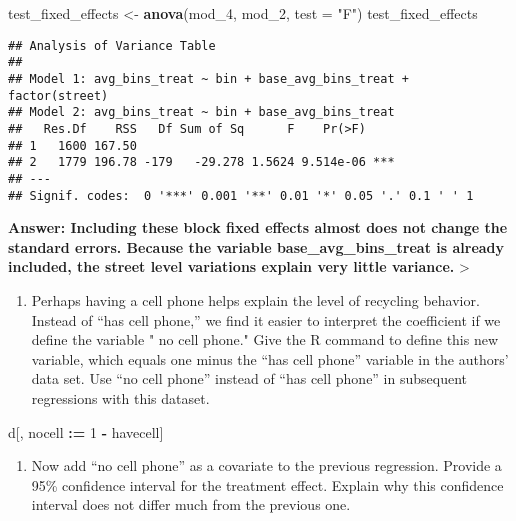 \documentclass[
]{article}
\newenvironment{Shaded}{\begin{snugshade}}{\end{snugshade}}
\newcommand{\DataTypeTok}[1]{\textcolor[rgb]{0.13,0.29,0.53}{#1}}
\newcommand{\DecValTok}[1]{\textcolor[rgb]{0.00,0.00,0.81}{#1}}
\newcommand{\ErrorTok}[1]{\textcolor[rgb]{0.64,0.00,0.00}{\textbf{#1}}}
\newcommand{\KeywordTok}[1]{\textcolor[rgb]{0.13,0.29,0.53}{\textbf{#1}}}
\newcommand{\NormalTok}[1]{#1}
\newcommand{\OperatorTok}[1]{\textcolor[rgb]{0.81,0.36,0.00}{\textbf{#1}}}
\newcommand{\StringTok}[1]{\textcolor[rgb]{0.31,0.60,0.02}{#1}}
\providecommand{\tightlist}{%
  \setlength{\itemsep}{0pt}\setlength{\parskip}{0pt}}
\begin{document}
\begin{Shaded}
\begin{Highlighting}[]
\NormalTok{test_fixed_effects <-}\StringTok{ }\KeywordTok{anova}\NormalTok{(mod_}\DecValTok{4}\NormalTok{, mod_}\DecValTok{2}\NormalTok{, }\DataTypeTok{test =} \StringTok{"F"}\NormalTok{)}
\NormalTok{test_fixed_effects}
\end{Highlighting}
\end{Shaded}

\begin{verbatim}
## Analysis of Variance Table
## 
## Model 1: avg_bins_treat ~ bin + base_avg_bins_treat + factor(street)
## Model 2: avg_bins_treat ~ bin + base_avg_bins_treat
##   Res.Df    RSS   Df Sum of Sq      F    Pr(>F)    
## 1   1600 167.50                                    
## 2   1779 196.78 -179   -29.278 1.5624 9.514e-06 ***
## ---
## Signif. codes:  0 '***' 0.001 '**' 0.01 '*' 0.05 '.' 0.1 ' ' 1
\end{verbatim}

\textbf{Answer: Including these block fixed effects almost does not
change the standard errors. Because the variable base\_avg\_bins\_treat
is already included, the street level variations explain very little
variance.} \textgreater{}

\begin{enumerate}
\def\labelenumi{\arabic{enumi}.}
\setcounter{enumi}{4}
\tightlist
\item
  Perhaps having a cell phone helps explain the level of recycling
  behavior. Instead of ``has cell phone,'' we find it easier to
  interpret the coefficient if we define the variable " no cell phone."
  Give the R command to define this new variable, which equals one minus
  the ``has cell phone'' variable in the authors' data set. Use ``no
  cell phone'' instead of ``has cell phone'' in subsequent regressions
  with this dataset.
\end{enumerate}

\begin{Shaded}
\begin{Highlighting}[]
\NormalTok{d[, nocell }\OperatorTok{:}\ErrorTok{=}\StringTok{ }\DecValTok{1} \OperatorTok{-}\StringTok{ }\NormalTok{havecell]}
\end{Highlighting}
\end{Shaded}

\begin{enumerate}
\def\labelenumi{\arabic{enumi}.}
\setcounter{enumi}{5}
\tightlist
\item
  Now add ``no cell phone'' as a covariate to the previous regression.
  Provide a 95\% confidence interval for the treatment effect. Explain
  why this confidence interval does not differ much from the previous
  one.
\end{enumerate}
\end{document}
